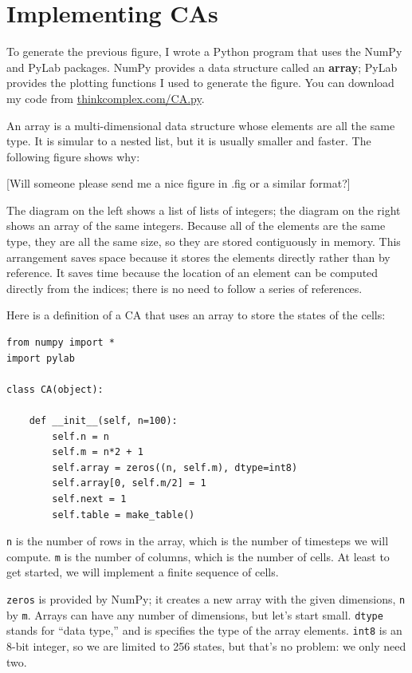 \documentclass[10pt]{book}
\begin{document}
\section{Implementing CAs}

To generate the previous figure, I wrote a Python program that
uses the NumPy and PyLab packages.  NumPy provides a
data structure called an {\bf array}; PyLab provides the plotting
functions I used to generate the figure.  
You can download my code from \url{thinkcomplex.com/CA.py}.

An array is a multi-dimensional data structure whose elements
are all the same type.  It is simular to a nested list, but it
is usually smaller and faster.  The following figure shows why:

[Will someone please send me a nice figure in .fig or a similar
format?]

\vspace{3in}

The diagram on the left shows a list of lists of integers; the
diagram on the right shows an array of the same integers.  Because
all of the elements are the same type, they are all the same size,
so they are stored contiguously in memory.  This arrangement
saves space because it stores the elements directly rather
than by reference.  It saves time because the location
of an element can be computed directly from the indices; there
is no need to follow a series of references.

Here is a definition of a CA that uses an array to store the states
of the cells:

\begin{verbatim}
from numpy import *
import pylab

class CA(object):

    def __init__(self, n=100):
        self.n = n
        self.m = n*2 + 1
        self.array = zeros((n, self.m), dtype=int8)
        self.array[0, self.m/2] = 1
        self.next = 1
        self.table = make_table()
\end{verbatim}

{\tt n} is the number of rows in the array, which is the number
of timesteps we will compute.  {\tt m} is the number of columns,
which is the number of cells.  At least to get started, we will implement
a finite sequence of cells.

{\tt zeros} is provided by NumPy; it creates a new array with
the given dimensions, {\tt n} by {\tt m}.  Arrays can have any
number of dimensions, but let's start small.  {\tt dtype} stands
for ``data type,'' and is specifies the type of the array elements.
{\tt int8} is an 8-bit integer, so we are limited to 256 states,
but that's no problem: we only need two.
\end{document}
